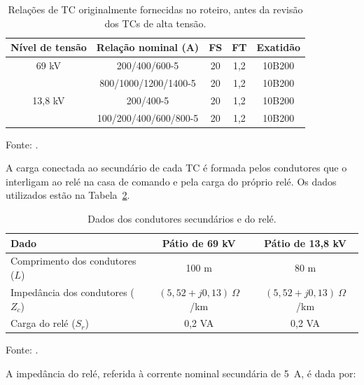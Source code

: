 \begin{table}[htbp]
    \centering
    \caption{Relações de TC originalmente fornecidas no roteiro, antes da revisão dos TCs de alta tensão.}
    \label{tab:tc_disponiveis}
    \begin{tabular}{ccccc}
        \hline
        \textbf{Nível de tensão} & \textbf{Relação nominal (A)} & \textbf{FS} & \textbf{FT} & \textbf{Exatidão} \\
        \hline
        69 kV   & 200/400/600-5          & 20 & 1,2 & 10B200 \\
        \hline
        \multirow{3}{*}{13,8 kV} & 800/1000/1200/1400-5 & 20 & 1,2 & 10B200 \\
                                 & 200/400-5            & 20 & 1,2 & 10B200 \\
                                 & 100/200/400/600/800-5 & 20 & 1,2 & 10B200 \\
        \hline
    \end{tabular}
    \par\vspace{2pt}
    {\small Fonte: \cite{sampaio2026roteiro}.}
\end{table}

A carga conectada ao secundário de cada TC é formada pelos condutores que o interligam ao relé na casa de comando e pela carga do próprio relé. Os dados utilizados estão na Tabela~\ref{tab:dados_carga_tc}.

\begin{table}[htbp]
    \centering
    \caption{Dados dos condutores secundários e do relé.}
    \label{tab:dados_carga_tc}
    \begin{tabular}{lcc}
        \hline
        \textbf{Dado} & \textbf{Pátio de 69 kV} & \textbf{Pátio de 13,8 kV} \\
        \hline
        Comprimento dos condutores ($L$)  & 100 m & 80 m \\
        Impedância dos condutores ($Z_c$) & $(5{,}52 + j0{,}13)~\Omega$/km & $(5{,}52 + j0{,}13)~\Omega$/km \\
        Carga do relé ($S_r$)             & 0,2 VA & 0,2 VA \\
        \hline
    \end{tabular}
    \par\vspace{2pt}
    {\small Fonte: \cite{sampaio2026roteiro}.}
\end{table}

A impedância do relé, referida à corrente nominal secundária de 5~A, é dada por:

